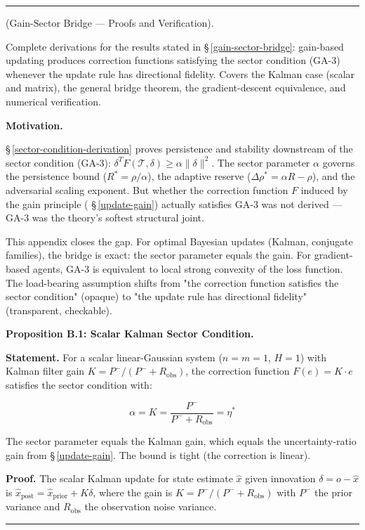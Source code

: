 \documentclass[11pt,oneside]{article}
\newcounter{claim}[section]
\renewcommand{\theclaim}{\thesection.\arabic{claim}}
\newenvironment{segment}[2]{%
  \refstepcounter{claim}%
  \bigskip\noindent\hrule\smallskip
  \noindent{\bfseries #1~\theclaim}\enskip(#2).\par\smallskip
  \noindent\ignorespaces
}{%
  \par\smallskip\noindent\hrule\bigskip
}
\newenvironment{derivation}[1][]{\begin{segment}{Derivation}{#1}}{\end{segment}}
\begin{document}
\begin{derivation}[Gain-Sector Bridge — Proofs and Verification]
\label{gain-sector-derivation}
Complete derivations for the results stated in \S\,\ref{gain-sector-bridge}: gain-based updating produces correction functions satisfying the sector condition (GA-3) whenever the update rule has directional fidelity. Covers the Kalman case (scalar and matrix), the general bridge theorem, the gradient-descent equivalence, and numerical verification.



\medskip\noindent\textbf{Motivation.}


\S\,\ref{sector-condition-derivation} proves persistence and stability downstream of the sector condition (GA-3): $\delta^T F(\mathcal{T}, \delta) \geq \alpha \lVert\delta\rVert^2$. The sector parameter $\alpha$ governs the persistence bound ($R^* = \rho/\alpha$), the adaptive reserve ($\Delta\rho^* = \alpha R - \rho$), and the adversarial scaling exponent. But whether the correction function $F$ induced by the gain principle ( \S\,\ref{update-gain}) actually satisfies GA-3 was not derived — GA-3 was the theory's softest structural joint.

This appendix closes the gap. For optimal Bayesian updates (Kalman, conjugate families), the bridge is exact: the sector parameter equals the gain. For gradient-based agents, GA-3 is equivalent to local strong convexity of the loss function. The load-bearing assumption shifts from "the correction function satisfies the sector condition" (opaque) to "the update rule has directional fidelity" (transparent, checkable).



\medskip\noindent\textbf{Proposition B.1: Scalar Kalman Sector Condition.}


\textbf{Statement.} For a scalar linear-Gaussian system ($n = m = 1$, $H = 1$) with Kalman filter gain $K = P^- / (P^- + R_{\text{obs}})$, the correction function $F(e) = K \cdot e$ satisfies the sector condition with:


$$\alpha = K = \frac{P^-}{P^- + R_{\text{obs}}} = \eta^*$$

The sector parameter equals the Kalman gain, which equals the uncertainty-ratio gain from \S\,\ref{update-gain}. The bound is tight (the correction is linear).

\textbf{Proof.} The scalar Kalman update for state estimate $\hat x$ given innovation $\delta = o - \hat x$ is $\hat x_\text{post} = \hat x_\text{prior} + K \delta$, where the gain is $K = P^- / (P^- + R_\text{obs})$ with $P^-$ the prior variance and $R_\text{obs}$ the observation noise variance.


\end{derivation}
\end{document}
